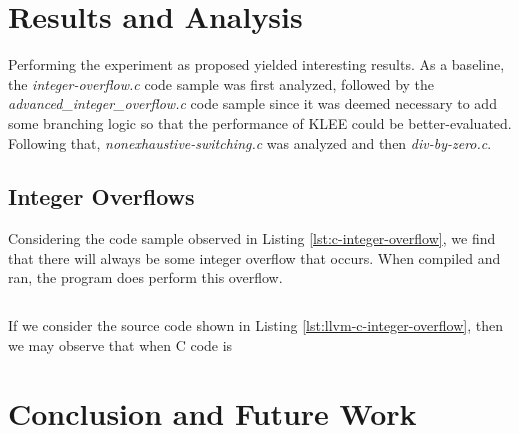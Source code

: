 \documentclass[conference]{IEEEtran}
\newenvironment{code}{\captionsetup{type=listing}}{}
\begin{document}
\section{Results and Analysis}
Performing the experiment as proposed yielded interesting results. As a baseline, the
\textit{integer-overflow.c} code sample was first analyzed, followed by the
\textit{advanced\_integer\_overflow.c} code sample since it was deemed necessary to
add some branching logic so that the performance of KLEE could be better-evaluated.
Following that, \textit{nonexhaustive-switching.c} was analyzed and then
\textit{div-by-zero.c}.


\subsection{Integer Overflows}
Considering the code sample observed in Listing \ref{lst:c-integer-overflow}, we find
that there will always be some integer overflow that occurs. When compiled and ran, the
program does perform this overflow.

\begin{code}
    \medskip
    \inputminted[firstline=6,lastline=19]{llvm}{../code-examples/c/integer-overflow.ll}
    \label{lst:llvm-c-integer-overflow}
    \medskip
\end{code}

If we consider the source code shown in Listing \ref{lst:llvm-c-integer-overflow},
then we may observe that when C code is


\section{Conclusion and Future Work}




\end{document}
